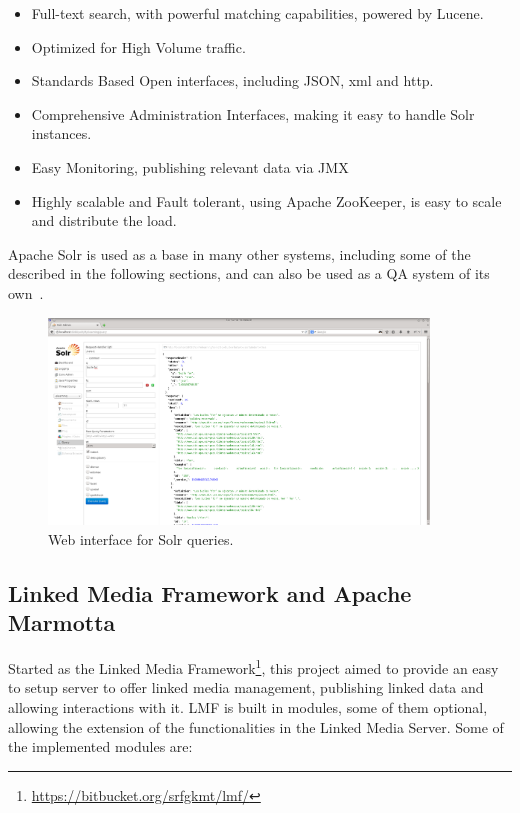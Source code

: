 \begin{itemize}%
  \item Full-text search, with powerful matching capabilities, powered by Lucene.
  \item Optimized for High Volume traffic.
  \item Standards Based Open interfaces, including JSON, xml and http.
  \item Comprehensive Administration Interfaces, making it easy to handle Solr instances.
  \item Easy Monitoring, publishing relevant data via JMX
  \item Highly scalable and Fault tolerant, using Apache ZooKeeper, is easy to scale and distribute the load.
\end{itemize}

Apache Solr is used as a base in many other systems, including some of the described in the following sections, and can also be used as a \ac{QA} system of its own~\cite{ingersoll2013taming}.

\begin{figure}[!htbp]
    \centering
    \includegraphics[width=0.9\textwidth]{img/screens/solr-interface.png}
    \caption{Web interface for Solr queries.}
    \label{fig:solr1}
\end{figure}


\subsection{Linked Media Framework and Apache Marmotta}

Started as the Linked Media Framework\footnote{\url{https://bitbucket.org/srfgkmt/lmf/}}, this project aimed to provide an easy to setup server to offer linked media management, publishing linked data and allowing interactions with it. \ac{LMF} is built in modules, some of them optional, allowing the extension of the functionalities in the Linked Media Server. Some of the implemented modules are:

